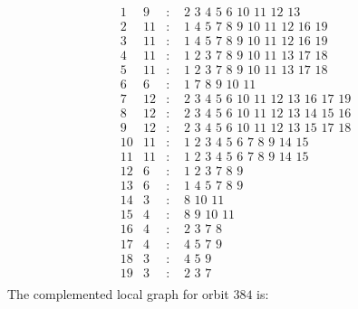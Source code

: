 \documentclass[12pt]{article}
\begin{document}
\begin{equation*}
\begin{array}{rrcl}
1&9&:&\,\,2\,\,3\,\,4\,\,5\,\,6\,\,10\,\,11\,\,12\,\,13\\
2&11&:&\,\,1\,\,4\,\,5\,\,7\,\,8\,\,9\,\,10\,\,11\,\,12\,\,16\,\,19\\
3&11&:&\,\,1\,\,4\,\,5\,\,7\,\,8\,\,9\,\,10\,\,11\,\,12\,\,16\,\,19\\
4&11&:&\,\,1\,\,2\,\,3\,\,7\,\,8\,\,9\,\,10\,\,11\,\,13\,\,17\,\,18\\
5&11&:&\,\,1\,\,2\,\,3\,\,7\,\,8\,\,9\,\,10\,\,11\,\,13\,\,17\,\,18\\
6&6&:&\,\,1\,\,7\,\,8\,\,9\,\,10\,\,11\\
7&12&:&\,\,2\,\,3\,\,4\,\,5\,\,6\,\,10\,\,11\,\,12\,\,13\,\,16\,\,17\,\,19\\
8&12&:&\,\,2\,\,3\,\,4\,\,5\,\,6\,\,10\,\,11\,\,12\,\,13\,\,14\,\,15\,\,16\\
9&12&:&\,\,2\,\,3\,\,4\,\,5\,\,6\,\,10\,\,11\,\,12\,\,13\,\,15\,\,17\,\,18\\
10&11&:&\,\,1\,\,2\,\,3\,\,4\,\,5\,\,6\,\,7\,\,8\,\,9\,\,14\,\,15\\
11&11&:&\,\,1\,\,2\,\,3\,\,4\,\,5\,\,6\,\,7\,\,8\,\,9\,\,14\,\,15\\
12&6&:&\,\,1\,\,2\,\,3\,\,7\,\,8\,\,9\\
13&6&:&\,\,1\,\,4\,\,5\,\,7\,\,8\,\,9\\
14&3&:&\,\,8\,\,10\,\,11\\
15&4&:&\,\,8\,\,9\,\,10\,\,11\\
16&4&:&\,\,2\,\,3\,\,7\,\,8\\
17&4&:&\,\,4\,\,5\,\,7\,\,9\\
18&3&:&\,\,4\,\,5\,\,9\\
19&3&:&\,\,2\,\,3\,\,7\\
\end{array}
\end{equation*}
The complemented local graph for orbit $384$ is:
\end{document}
